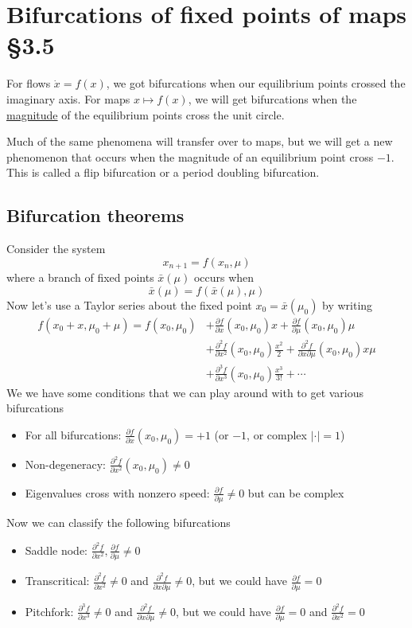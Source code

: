 \documentclass{article}
\begin{document}
\section{Bifurcations of fixed points of maps \S 3.5}

For flows $\dot{x}=f(x)$, we got bifurcations when our equilibrium points crossed the imaginary axis. For maps $x\mapsto f(x)$, we will get bifurcations when the \underline{magnitude} of the equilibrium points cross the unit circle.

Much of the same phenomena will transfer over to maps, but we will get a new phenomenon that occurs when the magnitude of an equilibrium point cross $-1$. This is called a flip bifurcation or a period doubling bifurcation.

\subsection{Bifurcation theorems}

Consider the system 
\[
x_{n+1} = f\left(x_n, \mu\right)
\]
where a branch of fixed points $\bar{x}(\mu)$ occurs when 
\[
\bar{x}(\mu) = f\left(\bar{x}(\mu), \mu\right)
\]
Now let's use a Taylor series about the fixed point $x_0=\bar{x}(\mu_0)$ by writing 
\begin{align*}
    f(x_0 + x, \mu_0 + \mu) = f(x_0,\mu_0) &+ \frac{\partial f}{\partial x}(x_0,\mu_0)x + \frac{\partial f}{\partial \mu}(x_0,\mu_0)\mu\\
    &+ \frac{\partial^2 f}{\partial x^2}(x_0,\mu_0)\frac{x^2}{2} + \frac{\partial^2 f}{\partial x \partial \mu}(x_0,\mu_0)x\mu \\
    &+ \frac{\partial^3 f}{\partial x^3}(x_0,\mu_0)\frac{x^3}{3!} + \cdots
\end{align*}
We we have some conditions that we can play around with to get various bifurcations
\begin{itemize}
    \item For all bifurcations: $\frac{\partial f}{\partial x}(x_0,\mu_0)= +1$ (or $-1$, or complex $|\cdot|=1$)
    \item Non-degeneracy: $\frac{\partial^2 f}{\partial x^2}(x_0,\mu_0)\neq 0$
    \item Eigenvalues cross with nonzero speed: $\frac{\partial f}{\partial \mu}\neq0$ but can be complex 
\end{itemize}
Now we can classify the following bifurcations 
\begin{itemize}
    \item Saddle node: $\frac{\partial^2 f}{\partial x^2},\frac{\partial f}{\partial \mu }\neq 0$
    \item Transcritical: $\frac{\partial^2 f}{\partial x^2}\neq 0$ and $\frac{\partial^2 f}{\partial x \partial \mu}\neq 0$, but we could have $\frac{\partial f}{\partial \mu }=0$
    \item Pitchfork: $\frac{\partial^3 f}{\partial x^3}\neq 0$ and $\frac{\partial^2 f}{\partial x \partial \mu}\neq 0$, but we could have $\frac{\partial f}{\partial \mu }=0$ and $\frac{\partial^2 f}{\partial x^2}= 0$
\end{itemize}
\end{document}
